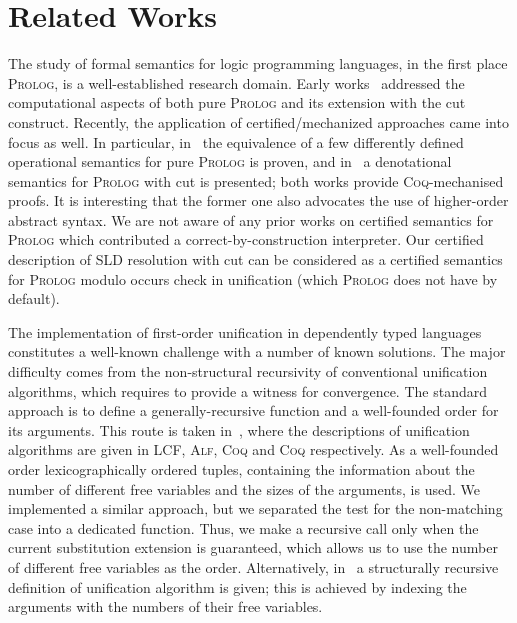 \section{Related Works}

The study of formal semantics for logic programming languages, in the first place \textsc{Prolog}, is a well-established research domain. Early
works~\cite{JonesMycroftSemantics,DebrayMishraSemantics} addressed the computational aspects of both pure \textsc{Prolog} and its extension
with the cut construct. Recently, the application of certified/mechanized approaches came into focus as well. In particular,
in~\cite{CertifiedPrologEquivalences} the equivalence of a few differently defined operational semantics
for pure \textsc{Prolog} is proven, and in~\cite{CeritfiedDenotationalCut} a denotational semantics for \textsc{Prolog} with cut is presented; both
works provide \textsc{Coq}-mechanised proofs. It is interesting that the former one also advocates the use of higher-order
abstract syntax. We are not aware of any prior works on certified semantics for \textsc{Prolog} which contributed a correct-by-construction
interpreter. Our certified description of SLD resolution with cut can be considered as a certified semantics for \textsc{Prolog} modulo
occurs check in unification (which \textsc{Prolog} does not have by default).

The implementation of first-order unification in dependently typed languages constitutes a well-known challenge with a number of
known solutions. The major difficulty comes from the non-structural recursivity of conventional unification algorithms, which
requires to provide a witness for convergence. The standard approach is to define a generally-recursive function and a well-founded order
for its arguments. This route is taken in~\cite{MGUinLCF,MGUinMLTT,IdempMGUinCoq,TextbookMGUinCoq}, where the descriptions of
unification algorithms are given in \textsc{LCF}, \textsc{Alf}, \textsc{Coq} and \textsc{Coq} respectively. As a well-founded
order lexicographically ordered tuples, containing the information about the number of different free variables and the sizes of
the arguments, is used. We implemented a similar approach, but we separated the test for the non-matching case into a dedicated
function. Thus, we make a recursive call only when the current substitution extension is guaranteed, which allows us to use the
number of different free variables as the order. Alternatively, in~\cite{StructuralMGU} a structurally recursive definition of
unification algorithm is given; this is achieved by indexing the arguments with the numbers of their free variables.

